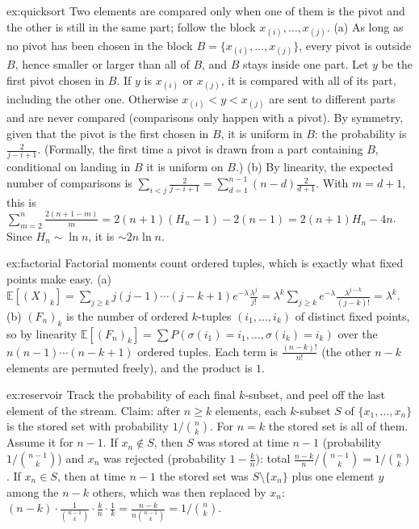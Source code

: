\begin{solution}{ex:quicksort}
\idea Two elements are compared only when one of them is the pivot and the other is still in the same part; follow
the block $x_{(i)},\dots,x_{(j)}$.
\writeup (a) As long as no pivot has been chosen in the block $B=\{x_{(i)},\dots,x_{(j)}\}$, every pivot is outside $B$, hence
smaller or larger than all of $B$, and $B$ stays inside one part. Let $y$ be the first pivot chosen in $B$. If $y$ is
$x_{(i)}$ or $x_{(j)}$, it is compared with all of its part, including the other one. Otherwise $x_{(i)}<y<x_{(j)}$ are sent to
different parts and are never compared (comparisons only happen with a pivot). By symmetry, given that the pivot
is the first chosen in $B$, it is uniform in $B$: the probability is $\frac2{j-i+1}$. (Formally, the first time a pivot is
drawn from a part containing $B$, conditional on landing in $B$ it is uniform on $B$.)
(b) By linearity, the expected number of comparisons is $\sum_{i<j}\frac2{j-i+1}=\sum_{d=1}^{n-1}(n-d)\frac2{d+1}$. With $m=d+1$,
this is $\sum_{m=2}^n\frac{2(n+1-m)}m=2(n+1)(H_n-1)-2(n-1)=2(n+1)H_n-4n$. Since $H_n\sim\ln n$, it is $\sim2n\ln n$.
\end{solution}

\begin{solution}{ex:factorial}
\idea Factorial moments count ordered tuples, which is exactly what fixed points make easy.
\writeup (a) $\mathbb E[(X)_k]=\sum_{j\ge k}j(j-1)\cdots(j-k+1)e^{-\lambda}\frac{\lambda^j}{j!}=\lambda^k\sum_{j\ge k}e^{-\lambda}\frac{\lambda^{j-k}}{(j-k)!}=\lambda^k$.
(b) $(F_n)_k$ is the number of ordered $k$-tuples $(i_1,\dots,i_k)$ of distinct fixed points, so by linearity
$\mathbb E[(F_n)_k]=\sum P(\sigma(i_1)=i_1,\dots,\sigma(i_k)=i_k)$ over the $n(n-1)\cdots(n-k+1)$ ordered tuples. Each term is
$\frac{(n-k)!}{n!}$ (the other $n-k$ elements are permuted freely), and the product is $1$.
\end{solution}

\begin{solution}{ex:reservoir}
\idea Track the probability of each final $k$-subset, and peel off the last element of the stream.
\writeup Claim: after $n\ge k$ elements, each $k$-subset $S$ of $\{x_1,\dots,x_n\}$ is the stored set with probability
$1/\binom nk$. For $n=k$ the stored set is all of them. Assume it for $n-1$. If $x_n\notin S$, then $S$ was stored at time
$n-1$ (probability $1/\binom{n-1}k$) and $x_n$ was rejected (probability $1-\frac kn$): total $\frac{n-k}n/\binom{n-1}k=1/\binom nk$. If
$x_n\in S$, then at time $n-1$ the stored set was $S\setminus\{x_n\}$ plus one element $y$ among the $n-k$ others, which
was then replaced by $x_n$: $(n-k)\cdot\frac1{\binom{n-1}k}\cdot\frac kn\cdot\frac1k=\frac{n-k}{n\binom{n-1}k}=1/\binom nk$.
\end{solution}


